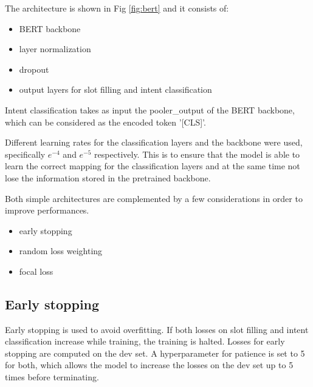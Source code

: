 \documentclass[a4paper]{article}
\begin{document}
The architecture is shown in Fig \ref{fig:bert} and it consists of:
\begin{itemize}
	\item BERT backbone
	\item layer normalization
	\item dropout
	\item output layers for slot filling and intent classification
\end{itemize}

Intent classification takes as input the pooler\_output of the BERT backbone, which can be considered as the encoded token '[CLS]'.

Different learning rates for the classification layers and the backbone were used, specifically $e^{-4}$ and $e^{-5}$ respectively. This is to ensure that the model is able to learn the correct mapping for the classification layers and at the same time not lose the information stored in the pretrained backbone. 


Both simple architectures are complemented by a few considerations in order to improve performances.

\begin{itemize}
	\item early stopping
	\item random loss weighting
	\item focal loss
\end{itemize}

\subsection{Early stopping}

Early stopping is used to avoid overfitting. If both losses on slot filling and intent classification increase while training, the training is halted. Losses for early stopping are computed on the dev set. A hyperparameter for patience is set to 5 for both, which allows the model to increase the losses on the dev set up to 5 times before terminating.


%	
\end{document}
